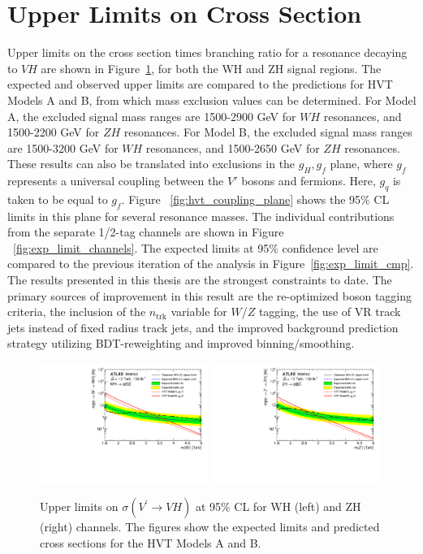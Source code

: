 \section{Upper Limits on Cross Section}
Upper limits on the cross section times branching ratio for a resonance decaying to $VH$ are shown in Figure~\ref{fig:exp_limits_atlas}, for both the WH and ZH signal regions.
The expected and observed upper limits are compared to the predictions for HVT Models A and B, from which mass exclusion values can be determined.
For Model A, the excluded signal mass ranges are 1500-2900 GeV for $WH$ resonances, and 1500-2200 GeV for $ZH$ resonances.
For Model B, the excluded signal mass ranges are 1500-3200 GeV for $WH$ resonances, and 1500-2650 GeV for $ZH$ resonances.
These results can also be translated into exclusions in the {$g_H,g_f$} plane, where $g_f$ represents a universal coupling between the $V'$ bosons and fermions.
Here, $g_q$ is taken to be equal to $g_f$. Figure ~\ref{fig:hvt_coupling_plane} shows the 95\% CL limits in this plane for several resonance masses.
The individual contributions from the separate 1/2-tag channels are shown in Figure ~\ref{fig:exp_limit_channels}.
The expected limits at 95\% confidence level are compared to the previous iteration of the analysis in Figure~\ref{fig:exp_limit_cmp}.
The results presented in this thesis are the strongest constraints to date.
The primary sources of improvement in this result are the re-optimized boson tagging criteria, the inclusion of the $n_{\mathrm{trk}}$ variable for $W$/$Z$ tagging, the use of VR track jets instead of fixed radius track jets, and the improved background prediction strategy utilizing BDT-reweighting and improved binning/smoothing.

\begin{figure}[htbp!]
    \begin{center}
        \includegraphics[width=0.49\textwidth]{VHqqbbLimitATLAS_WH.pdf}
        \includegraphics[width=0.49\textwidth]{VHqqbbLimitATLAS_ZH.pdf}
    \end{center}
    \caption{Upper limits on $\sigma(V^\prime \rightarrow VH)$ at 95\% CL for WH (left) and ZH (right) channels.
        The figures show the expected limits and predicted cross sections for the HVT Models A and B.
    }
    \label{fig:exp_limits_atlas}
\end{figure}

